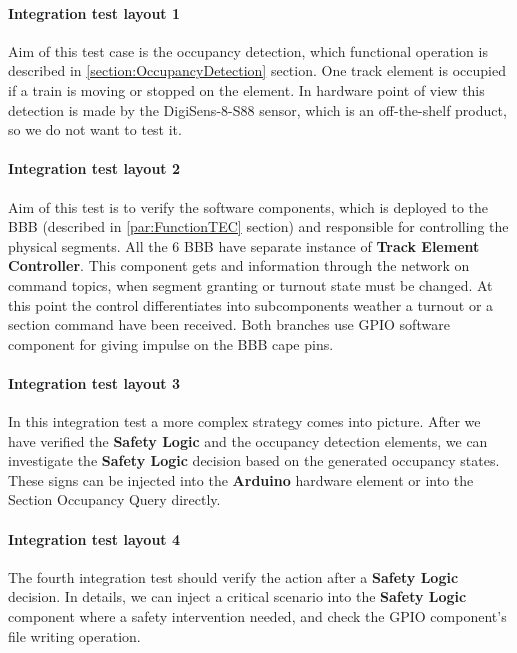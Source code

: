 \paragraph{Integration test layout 1}
Aim of this test case is the occupancy detection, which functional operation is described in \ref{section:OccupancyDetection} section. One track element is occupied if a train is moving or stopped on the element. In hardware point of view this detection is made by the DigiSens-8-S88 sensor, which is an off-the-shelf product, so we do not want to test it.  

\paragraph{Integration test layout 2}
Aim of this test is to verify the software components, which is deployed to the BBB (described in \ref{par:FunctionTEC} section) and responsible for controlling the physical segments. All the 6 BBB have separate instance of \textbf{Track Element Controller}. This component gets and information through the network on command topics, when segment granting or turnout state must be changed. At this point the control differentiates into subcomponents weather a turnout or a section command have been received. Both branches use GPIO software component for giving impulse on the BBB cape pins. 

\paragraph{Integration test layout 3}
In this integration test a more complex strategy comes into picture. After we have verified the \textbf{Safety Logic} and the occupancy detection elements, we can investigate the \textbf{Safety Logic} decision based on the generated occupancy states. These signs can be injected into the \textbf{Arduino} hardware element or into the Section Occupancy Query directly.

\paragraph{Integration test layout 4}
The fourth integration test should verify the action after a \textbf{Safety Logic} decision. In details, we can inject a critical scenario into the \textbf{Safety Logic} component where a safety intervention needed, and check the GPIO component's file writing operation.

